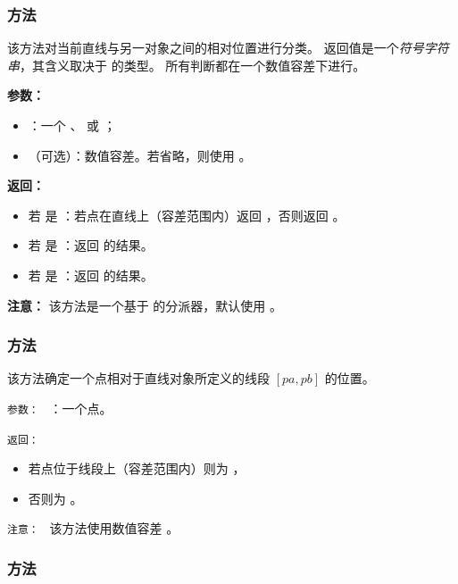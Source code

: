 \subsubsection{方法 }
\label{ssub:method_line_position}

该方法对当前直线与另一对象之间的相对位置进行分类。
返回值是一个\emph{符号字符串}，其含义取决于  的类型。
所有判断都在一个数值容差下进行。

\medskip
\textbf{参数：}
\begin{itemize}
  \item {}：一个 、 或 ；
  \item {}（可选）：数值容差。若省略，则使用 。
\end{itemize}

\medskip
\textbf{返回：}
\begin{itemize}
  \item 若  是 ：若点在直线上（容差范围内）返回 ，否则返回 。
  \item 若  是 ：返回  的结果。
  \item 若  是 ：返回  的结果。
\end{itemize}

\medskip
\textbf{注意：}
该方法是一个基于  的分派器，默认使用 。


\subsubsection{方法 }
\label{ssub:method_line_position_segment}

该方法确定一个点相对于直线对象所定义的线段
$[pa,pb]$ 的位置。

\texttt{参数： } ：一个点。

\texttt{返回： }
\begin{itemize}
  \item 若点位于线段上（容差范围内）则为 ，
  \item 否则为 。
\end{itemize}

\texttt{注意： } 该方法使用数值容差 。


\subsubsection{方法 }
\label{ssub:method_line_where_on_line}

